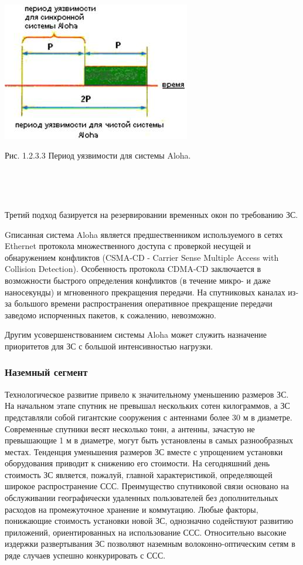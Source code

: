 \documentclass[a4paper]{report}
\begin{document}
~

\includegraphics[scale=1.3]{72}
{\centering\caption{\newline Рис. 1.2.3.3 Период уязвимости для системы Aloha.}\\}

~

Третий подход базируется на резервировании временных окон по требованию ЗС.

Gписанная система Aloha является предшественником используемого в сетях Ethernet протокола множественного доступа с проверкой несущей и обнаружением конфликтов (CSMA-CD - Carrier Sense Multiple Access with Collision Detection). Особенность протокола CDMA-CD заключается в возможности быстрого определения конфликтов (в течение микро- и даже наносекунды) и мгновенного прекращения передачи. На спутниковых каналах из-за большого времени распространения оперативное прекращение передачи заведомо испорченных пакетов, к сожалению, невозможно.

Другим усовершенствованием системы Aloha может служить назначение приоритетов для ЗС с большой интенсивностью нагрузки.

\subsubsection{Наземный сегмент}
Технологическое развитие привело к значительному уменьшению размеров ЗС. На начальном этапе спутник не превышал нескольких сотен килограммов, а ЗС представляли собой гигантские сооружения с антеннами более 30 м в диаметре. Современные спутники весят несколько тонн, а антенны, зачастую не превышающие 1 м в диаметре, могут быть установлены в самых разнообразных местах. Тенденция уменьшения размеров ЗС вместе с упрощением установки оборудования приводит к снижению его стоимости. На сегодняшний день стоимость ЗС является, пожалуй, главной характеристикой, определяющей широкое распространение ССС. Преимущество спутниковой связи основано на обслуживании географически удаленных пользователей без дополнительных расходов на промежуточное хранение и коммутацию. Любые факторы, понижающие стоимость установки новой ЗС, однозначно содействуют развитию приложений, ориентированных на использование ССС.
\newpage Относительно высокие издержки развертывания ЗС позволяют наземным волоконно-оптическим сетям в ряде случаев успешно конкурировать с ССС.
\end{document}
